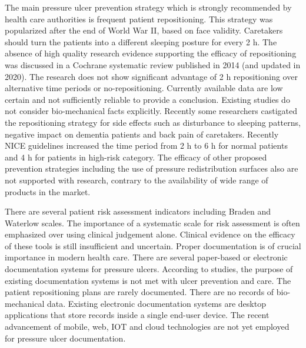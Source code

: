 The main pressure ulcer prevention strategy which is strongly recommended by health care authorities is frequent patient repositioning. This strategy was popularized after the end of World War II, based on face validity. Caretakers should turn the patients into a different sleeping posture for every 2 h.
The absence of high quality research evidence supporting the efficacy of repositioning was discussed in a Cochrane systematic review published in 2014 (and updated in 2020). The research does not show significant advantage of 2 h repositioning over alternative time periods or no-repositioning. Currently available data are low certain and not sufficiently reliable to provide a conclusion. Existing studies do not consider bio-mechanical facts explicitly. Recently some researchers castigated the repositioning strategy for side effects such as disturbance to sleeping patterns, negative impact on dementia patients and back pain of caretakers. Recently NICE guidelines increased the time period from 2 h to 6 h for normal patients and 4 h for patients in high-risk category. The efficacy of other proposed prevention strategies including the use of pressure redistribution surfaces also are not supported with research, contrary to the availability of wide range of products in the market.

There are several patient risk assessment indicators including Braden and Waterlow scales. The importance of a systematic scale for risk assessment is often emphasized over using clinical judgement alone. Clinical evidence on the efficacy of these tools is still insufficient and uncertain.
Proper documentation is of crucial importance in modern health care. There are several paper-based or electronic documentation systems for pressure ulcers. According to studies, the purpose of existing documentation systems is not met with ulcer prevention and care. The patient repositioning plans are rarely documented. There are no records of bio-mechanical data. Existing electronic documentation systems are desktop applications that store records inside a single end-user device. The recent advancement of mobile, web, IOT and cloud technologies are not yet employed for pressure ulcer documentation. 

